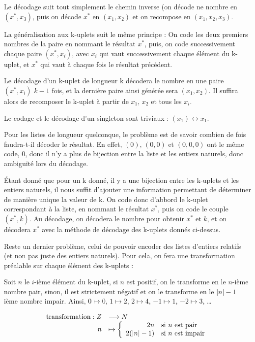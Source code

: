 \documentclass{article}
\begin{document}
Le décodage suit tout simplement le chemin inverse (on décode ne nombre en $(x^*, x_3)$, puis on décode $x^*$ en $(x_1, x_2)$ et on recompose en $(x_1, x_2, x_3)$.

La généralisation aux k-uplets suit le même principe : On code les deux premiers nombres de la paire en nommant le résultat $x^*$, puis, on
code successivement chaque paire $(x^*, x_i)$, avec $x_i$ qui vaut successivement chaque élément du k-uplet, et $x^*$ qui vaut à chaque fois
le résultat précédent.

Le décodage d'un k-uplet de longueur k décodera le nombre en une paire $(x^*, x_i)$ $k-1$ fois, et la dernière paire ainsi générée sera
$(x_1, x_2)$. Il suffira alors de recomposer le k-uplet à partir de $x_1$, $x_2$ et tous les $x_i$.

Le codage et le décodage d'un singleton sont triviaux : $(x_1) \leftrightarrow x_1$.

Pour les listes de longueur quelconque, le problème est de savoir combien de fois faudra-t-il décoder le résultat. En effet, $(0)$, $(0,0)$
et $(0,0,0)$ ont le même code, $0$, donc il n'y a plus de bijection entre la liste et les entiers naturels, donc ambiguïté lors du décodage.

Étant donné que pour un k donné, il y a une bijection entre les k-uplets et les entiers naturels, il nous suffit d'ajouter une information
permettant de déterminer de manière unique la valeur de k. On code donc d'abbord le k-uplet correspondant à la liste, en nommant le résultat
$x^*$, puis on code le couple $(x^*, k)$. Au décodage, on décodera le nombre pour obtenir $x^*$ et $k$, et on décodera $x^*$ avec la méthode
de décodage des k-uplets donnés ci-dessus.

Reste un dernier problème, celui de pouvoir encoder des listes d'entiers relatifs (et non pas juste des entiers naturels). Pour cela, on
fera une transformation préalable sur chaque élément des k-uplets :

Soit $n$ le $i$-ième élément du k-uplet, si $n$ est positif, on le transforme en le $n$-ième nombre pair, sinon, il est strictement négatif et on le transforme en le $|n|-1$ ième nombre impair. Ainsi, $0 \mapsto 0$, $1 \mapsto 2$, $2 \mapsto 4$, $-1 \mapsto 1$, $-2 \mapsto 3$, \dots

\begin{equation}
  \begin{array}{r l}
    \mathrm{transformation} : Z & \longrightarrow N \\
    n & \mapsto
    \left \{
      \begin{array}{r l}
        2n       & \text{si $n$ est pair} \\
        2(|n|-1) & \text{si $n$ est impair}
      \end{array}
    \right .
  \end{array}
\end{equation}
\end{document}
